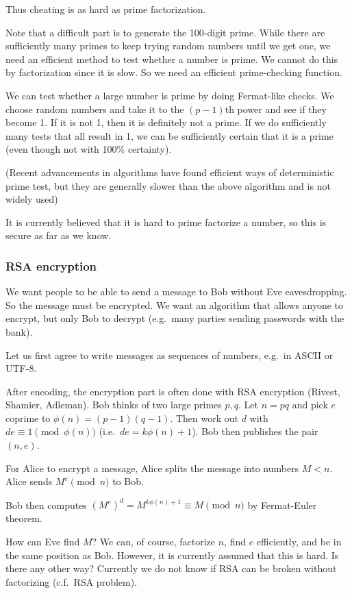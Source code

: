 \documentclass[a4paper]{article}
\begin{document}
Thus cheating is as hard as prime factorization.

Note that a difficult part is to generate the 100-digit prime. While there are sufficiently many primes to keep trying random numbers until we get one, we need an efficient method to test whether a number is prime. We cannot do this by factorization since it is slow. So we need an efficient prime-checking function.

We can test whether a large number is prime by doing Fermat-like checks. We choose random numbers and take it to the $(p - 1)$th power and see if they become 1. If it is not 1, then it is definitely not a prime. If we do sufficiently many tests that all result in 1, we can be sufficiently certain that it is a prime (even though not with 100\% certainty).

(Recent advancements in algorithms have found efficient ways of deterministic prime test, but they are generally slower than the above algorithm and is not widely used)

It is currently believed that it is hard to prime factorize a number, so this is secure as far as we know.
\subsubsection*{RSA encryption}

\begin{thm}
  We want people to be able to send a message to Bob without Eve eavesdropping. So the message must be encrypted. We want an algorithm that allows anyone to encrypt, but only Bob to decrypt (e.g.\ many parties sending passwords with the bank).

  Let us first agree to write messages as sequences of numbers, e.g.\ in ASCII or UTF-8.

  After encoding, the encryption part is often done with RSA encryption (Rivest, Shamier, Adleman). Bob thinks of two large primes $p, q$. Let $n = pq$ and pick $e$ coprime to $\phi(n) = (p - 1)(q - 1)$. Then work out $d$ with $de \equiv 1\pmod {\phi(n)}$ (i.e.\ $de = k\phi(n) + 1$). Bob then publishes the pair $(n, e)$.

  For Alice to encrypt a message, Alice splits the message into numbers $M < n$. Alice sends $M^e \pmod n$ to Bob.

  Bob then computes $(M^e)^d = M^{k\phi(n) + 1} \equiv M\pmod n$ by Fermat-Euler theorem.

  How can Eve find $M$? We can, of course, factorize $n$, find $e$ efficiently, and be in the same position as Bob. However, it is currently assumed that this is hard. Is there any other way? Currently we do not know if RSA can be broken without factorizing (c.f.\ RSA problem).
\end{thm}
\end{document}

